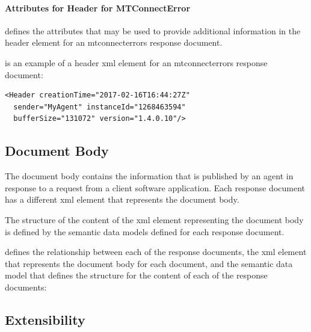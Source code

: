 \FloatBarrier

\paragraph{Attributes for Header for MTConnectError}\mbox{}

 defines the attributes that may be used to provide additional information in the \gls{header} element for an \gls{mtconnecterrors response document}. 



 is an example of a \gls{header} \gls{xml} element for an \gls{mtconnecterrors response document}:

\begin{lstlisting}[firstnumber=1,escapechar=|,%
caption={Example of Header XML Element for MTConnectError}, label={lst:header-xml-element-for-mtconnecterror}]
<Header creationTime="2017-02-16T16:44:27Z" 
  sender="MyAgent" instanceId="1268463594"
  bufferSize="131072" version="1.4.0.10"/>
\end{lstlisting}

\subsection{Document Body}
\label{sec:Document Body}

The \gls{document body} contains the information that is published by an \gls{agent} in response to a \gls{request} from a client software application.  Each \gls{response document} has a different \gls{xml} element that represents the \gls{document body}.

The structure of the content of the \gls{xml} element representing the \gls{document body} is defined by the \glspl{semantic data model} defined for each \gls{response document}.

 defines the relationship between each of the \glspl{response document}, the \gls{xml} element that represents the \gls{document body} for each document, and the \gls{semantic data model} that defines the structure for the content of each of the \glspl{response document}:



\subsection{Extensibility}
\label{sec:Extensibility}

